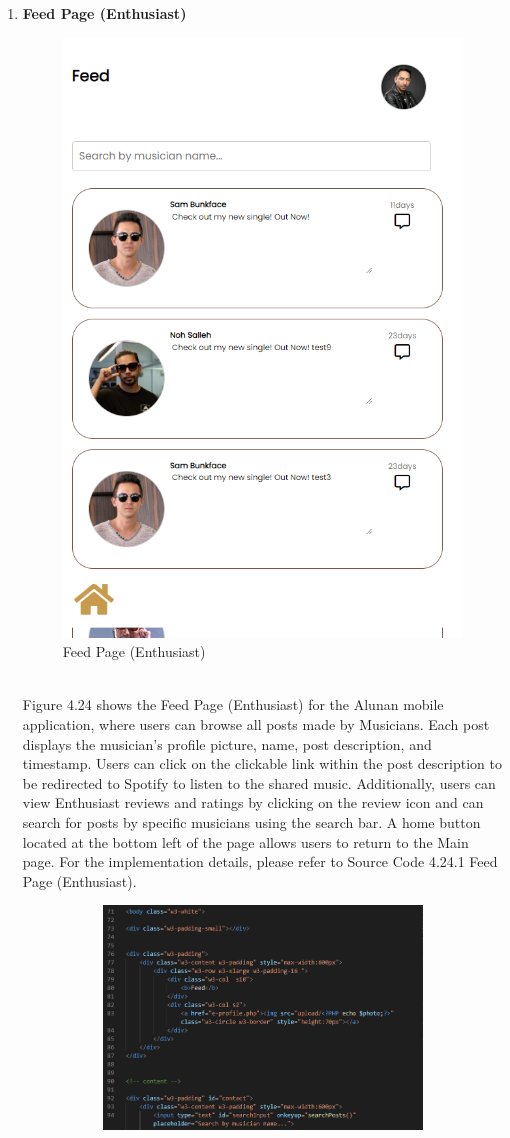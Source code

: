 \begin{enumerate}[1.]
    \item \textbf{Feed Page (Enthusiast)}
    \begin{figure}[h]
        \centering
        \includegraphics[width=0.5\linewidth]{mainmatter/images/frontend/ss/Feed (Enthusiast).png}
        \caption{Feed Page (Enthusiast)}
        \label{fig:myfig63}
    \end{figure} \\
    Figure 4.24 shows the Feed Page (Enthusiast) for the Alunan mobile application, where users can browse all posts made by Musicians. Each post displays the musician's profile picture, name, post description, and timestamp. Users can click on the clickable link within the post description to be redirected to Spotify to listen to the shared music. Additionally, users can view Enthusiast reviews and ratings by clicking on the review icon and can search for posts by specific musicians using the search bar. A home button located at the bottom left of the page allows users to return to the Main page. For the implementation details, please refer to Source Code 4.24.1 Feed Page (Enthusiast).
    \begin{figure}[h]\ContinuedFloat
        \centering
        \begin{subfigure}[b]{0.6\textwidth}
            \centering
            \includegraphics[width=\textwidth]{mainmatter/images/frontend/code/efeed.png}

\end{subfigure}
\end{figure}
\end{enumerate}
